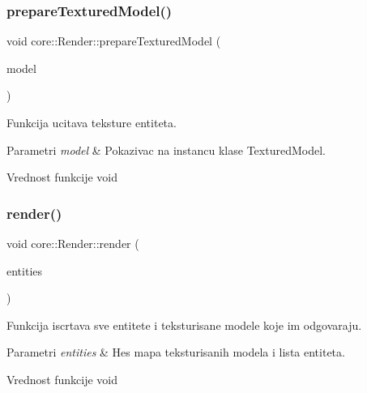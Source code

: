 \subsubsection{\texorpdfstring{prepare\+Textured\+Model()}{prepareTexturedModel()}}
{\footnotesize\ttfamily void core\+::\+Render\+::prepare\+Textured\+Model (\begin{DoxyParamCaption}\item[{\hyperlink{classmodel_1_1TexturedModel}{Textured\+Model} $\ast$}]{model }\end{DoxyParamCaption})}



Funkcija ucitava teksture entiteta. 


\begin{DoxyParams}{Parametri}
{\em model} & Pokazivac na instancu klase Textured\+Model. \\
\hline
\end{DoxyParams}
\begin{DoxyReturn}{Vrednost funkcije}
void 
\end{DoxyReturn}
\mbox{\label{classcore_1_1Render_ab36887be4cb2f56e73b10f78e5d04d4a}} 
\subsubsection{\texorpdfstring{render()}{render()}}
{\footnotesize\ttfamily void core\+::\+Render\+::render (\begin{DoxyParamCaption}\item[{map$<$ \hyperlink{classmodel_1_1TexturedModel}{Textured\+Model} $\ast$, list$<$ \hyperlink{classentity_1_1Entity}{Entity} $\ast$$>$$>$}]{entities }\end{DoxyParamCaption})}



Funkcija iscrtava sve entitete i teksturisane modele koje im odgovaraju. 


\begin{DoxyParams}{Parametri}
{\em entities} & Hes mapa teksturisanih modela i lista entiteta. \\
\hline
\end{DoxyParams}
\begin{DoxyReturn}{Vrednost funkcije}
void 
\end{DoxyReturn}
\mbox{\label{classcore_1_1Render_adfa16af79f2e428b94ccbb406e77ef93}} 
